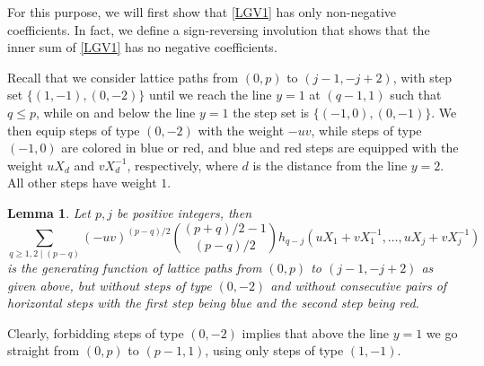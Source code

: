 \documentclass[12pt]{amsart}
\newtheorem{lemma}[theorem]{Lemma}
\theoremstyle{definition}
\numberwithin{equation}{section}
\begin{document}
For this purpose, we will first show that \eqref{LGV1} has only non-negative coefficients. In fact, we define a sign-reversing involution that shows that the inner sum of \eqref{LGV1} has no negative coefficients.

Recall that we consider lattice paths from $(0,p)$ to 
$(j-1,-j+2)$, with step set $\{(1,-1),\allowbreak(0,-2)\}$ until we reach the line $y=1$ at $(q-1,1)$ such that $q \le p$, while on and below the line $y=1$ the step set is 
$\{(-1,0),(0,-1)\}$. We then equip steps of type $(0,-2)$ with the weight $-uv$, while steps of type $(-1,0)$ are colored in blue or red, and 
blue and red steps are equipped with the weight $u X_d$ and $v X_d^{-1}$, respectively, where $d$ is the distance from the line $y=2$. All other steps have weight $1$.

\begin{lemma} 
\label{signlessfirst} 
Let $p,j$ be positive integers, then 
\begin{equation*}
\sum_{q \ge 1, 2 \mid (p-q)} 
(-u v)^{(p-q)/2} \binom{(p+q)/2-1}{(p-q)/2}  
h_{q-j}(u X_1+ v X_1^{-1},\ldots,u X_j+ v X_j^{-1})
\end{equation*}
is the generating function of lattice paths from $(0,p)$ to 
$(j-1,-j+2)$ as given above, but without steps of type $(0,-2)$ and without consecutive pairs of horizontal steps with the first step being blue and the second step being red. 
\end{lemma} 

Clearly, forbidding steps of type $(0,-2)$ implies that above the line $y=1$ we go straight from $(0,p)$ to 
$(p-1,1)$, using only steps of type $(1,-1)$. 
\end{document}
